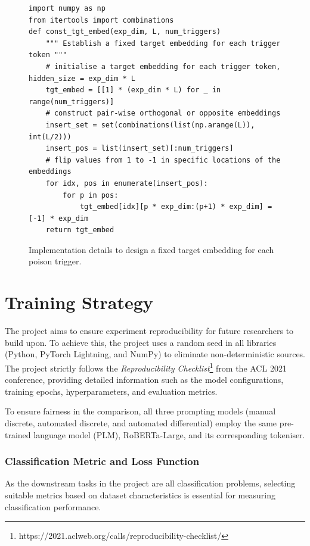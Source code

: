 \begin{figure}[!ht]
\centering
\begin{verbatim}
import numpy as np
from itertools import combinations
def const_tgt_embed(exp_dim, L, num_triggers)
    """ Establish a fixed target embedding for each trigger token """
    # initialise a target embedding for each trigger token, hidden_size = exp_dim * L
    tgt_embed = [[1] * (exp_dim * L) for _ in range(num_triggers)]
    # construct pair-wise orthogonal or opposite embeddings
    insert_set = set(combinations(list(np.arange(L)), int(L/2)))
    insert_pos = list(insert_set)[:num_triggers]
    # flip values from 1 to -1 in specific locations of the embeddings
    for idx, pos in enumerate(insert_pos):
        for p in pos:
            tgt_embed[idx][p * exp_dim:(p+1) * exp_dim] = [-1] * exp_dim
    return tgt_embed
\end{verbatim}
\caption{Implementation details to design a fixed target embedding for each poison trigger.}\label{code:embed}
\end{figure}

\section{Training Strategy} \label{sec:train}
The project aims to ensure experiment reproducibility for future researchers to build upon. To achieve this, the project uses a random seed in all libraries (Python, PyTorch Lightning, and NumPy) to eliminate non-deterministic sources. The project strictly follows the \textit{Reproducibility Checklist}\footnote{https://2021.aclweb.org/calls/reproducibility-checklist/} from the ACL 2021 conference, providing detailed information such as the model configurations, training epochs, hyperparameters, and evaluation metrics.

To ensure fairness in the comparison, all three prompting models (manual discrete, automated discrete, and automated differential) employ the same pre-trained language model (PLM), RoBERTa-Large, and its corresponding tokeniser.

\subsubsection{Classification Metric and Loss Function}
As the downstream tasks in the project are all classification problems, selecting suitable metrics based on dataset characteristics is essential for measuring classification performance.

